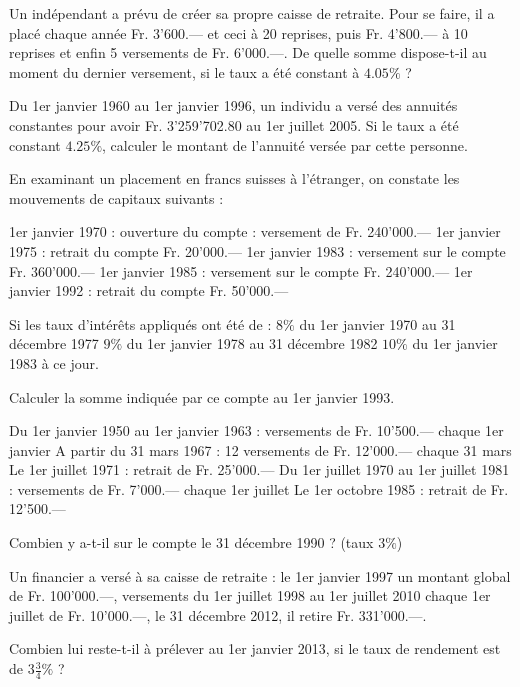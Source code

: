 \begin{exercice}
Un indépendant a prévu de créer sa propre caisse de retraite. Pour se faire, il a placé chaque année Fr. 3'600.— et ceci à 20 reprises, puis Fr. 4'800.— à 10 reprises et enfin 5 versements de Fr. 6'000.—.
De quelle somme dispose-t-il au moment du dernier versement, si le taux a été constant à $4.05 \%$ ?

Du 1er janvier 1960 au 1er janvier 1996, un individu a versé des annuités constantes pour avoir Fr. 3'259'702.80 au 1er juillet 2005. Si le taux a été constant $4.25 \%$, calculer le montant de l’annuité versée par cette personne.
\end{exercice}

\begin{exercice}
En examinant un placement en francs suisses à l’étranger, on constate les mouvements de capitaux suivants :

1er janvier 1970 : ouverture du compte : versement de Fr. 240'000.—	
1er janvier 1975 : retrait du compte Fr. 20'000.—	
1er janvier 1983 : versement sur le compte Fr. 360'000.—	
1er janvier 1985 : versement sur le compte Fr. 240'000.—	
1er janvier 1992 : retrait du compte Fr. 50'000.—

Si les taux d’intérêts appliqués ont été de :
$8 \%$ du 1er janvier 1970 au 31 décembre 1977 
$9 \%$ du 1er janvier 1978 au 31 décembre 1982
$10 \%$ du 1er janvier 1983 à ce jour.

Calculer la somme indiquée par ce compte au 1er janvier 1993. 
\end{exercice}

\begin{exercice}
Du 1er janvier 1950 au 1er janvier 1963 : 	versements de Fr. 10'500.— chaque 1er janvier
A partir du 31 mars 1967 : 		12 versements de Fr. 12'000.— chaque 31 mars
Le 1er juillet 1971 : 		retrait de Fr. 25'000.—
Du 1er juillet 1970 au 1er juillet 1981 : 	versements de Fr. 7'000.— chaque 1er juillet
Le 1er octobre 1985 : 		retrait de Fr. 12'500.—

Combien y a-t-il sur le compte le 31 décembre 1990 ? (taux $3 \%$)
\end{exercice}

\begin{exercice}
Un financier a versé à sa caisse de retraite :
le 1er janvier 1997 un montant global de Fr. 100’000.—,
versements du 1er juillet 1998 au 1er juillet 2010 chaque 1er juillet de Fr. 10’000.—,
le 31 décembre 2012, il retire Fr. 331’000.—.

Combien lui reste-t-il à prélever au 1er janvier 2013, si le taux de rendement est de $3\frac{3}{4} \%$ ?
\end{exercice}

